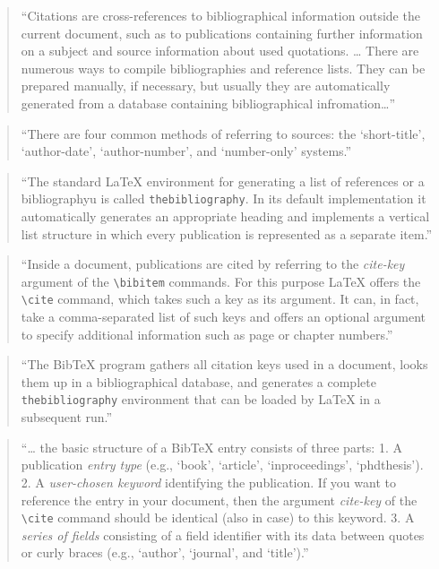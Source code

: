 \documentclass[]{tufte-book}
\begin{document}
\begin{quote}
``Citations are cross-references to bibliographical information outside
the current document, such as to publications containing further information
on a subject and source information about used quotations. \ldots{} There are
numerous ways to compile bibliographies and reference lists. They can be
prepared manually, if necessary, but usually they are automatically
generated from a database containing bibliographical infromation\ldots{}''
\citep{mittelbach2004latex}
\end{quote}

\begin{quote}
``There are four common methods of referring to sources: the `short-title',
`author-date', `author-number', and `number-only' systems.'' \citep{mittelbach2004latex}
\end{quote}

\begin{quote}
``The standard LaTeX environment for generating a list of references or a
bibliographyu is called \texttt{thebibliography}. In its default implementation it
automatically generates an appropriate heading and implements a vertical
list structure in which every publication is represented as a separate item.''
\citep{mittelbach2004latex}
\end{quote}

\begin{quote}
``Inside a document, publications are cited by referring to the \emph{cite-key}
argument of the \texttt{\textbackslash{}bibitem} commands. For this purpose LaTeX offers the \texttt{\textbackslash{}cite}
command, which takes such a key as its argument. It can, in fact, take a
comma-separated list of such keys and offers an optional argument to specify
additional information such as page or chapter numbers.'' \citep{mittelbach2004latex}
\end{quote}

\begin{quote}
``The BibTeX program gathers all citation keys used in a document, looks them
up in a bibliographical database, and generates a complete \texttt{thebibliography}
environment that can be loaded by LaTeX in a subsequent run.'' \citep{mittelbach2004latex}
\end{quote}

\begin{quote}
``\ldots{} the basic structure of a BibTeX entry consists of three parts: 1.
A publication \emph{entry type} (e.g., `book', `article', `inproceedings',
`phdthesis'). 2. A \emph{user-chosen keyword} identifying the publication. If you
want to reference the entry in your document, then the argument \emph{cite-key}
of the \texttt{\textbackslash{}cite} command should be identical (also in case) to this keyword.
3. A \emph{series of fields} consisting of a field identifier with its data between
quotes or curly braces (e.g., `author', `journal', and `title').'' \citep{mittelbach2004latex}
\end{quote}
\end{document}
